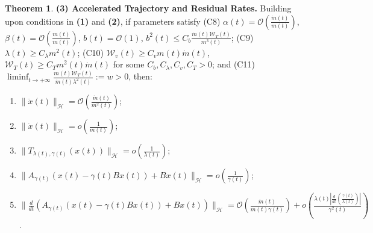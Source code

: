 \documentclass{article}
\theoremstyle{definition}
\newtheorem{theorem}{Theorem}[section]
\theoremstyle{definition}
\theoremstyle{definition}
\begin{document}
\begin{theorem}
\smallskip
\noindent \textbf{(3) Accelerated Trajectory and Residual Rates.} Building upon conditions in \textbf{(1)} and \textbf{(2)}, if parameters satisfy {\rm (C8)} $\alpha(t) = \mathcal{O}( \frac{\dot{m}(t)}{m(t)} )$, $\beta(t) = \mathcal{O}( \frac{m(t)}{\dot{m}(t)} )$, $b(t) = \mathcal{O}(1)$, $b^2(t) \leq C_b \frac{\dot{m}(t) \mathcal{W}_T(t)}{m^3(t)}$; {\rm (C9)} $\lambda(t) \ge C_{\lambda} m^2(t)$; {\rm (C10)} $\mathcal{W}_v(t) \ge C_v m(t)\dot{m}(t)$, $\mathcal{W}_T(t) \ge C_T m^2(t)\dot{m}(t)$ for some $C_b, C_{\lambda}, C_v, C_T > 0$; and {\rm (C11)} $\liminf_{t \to +\infty} \frac{m(t) \mathcal{W}_T(t)}{\dot{m}(t) \lambda^2(t)}:=w > 0$, then:
\begin{enumerate}[label=(\roman*), resume, nosep, itemsep=2pt]
    \item $\|\ddot{x}(t)\|_{\mathcal{H}} = \mathcal{O}\left( \frac{\dot{m}(t)}{m^2(t)} \right)$;
    \item $\|\dot{x}(t)\|_{\mathcal{H}} = o\left( \frac{1}{m(t)} \right)$;
    \item $\|T_{\lambda(t), \gamma(t)}(x(t))\|_{\mathcal{H}} = o\left( \frac{1}{\lambda(t)} \right)$;
    \item $\| A_{\gamma(t)} ( x(t) - \gamma(t) Bx(t) ) + Bx(t) \|_{\mathcal{H}} = o\left( \frac{1}{\gamma(t)} \right)$;
    \item $\| \frac{d}{dt} ( A_{\gamma(t)} ( x(t) - \gamma(t) Bx(t) ) + Bx(t) ) \|_{\mathcal{H}} = \mathcal{O}\left( \frac{\dot{m}(t)}{m(t) \gamma(t)} \right) + o\left( \frac{\lambda(t) | \frac{d}{dt} ( \frac{\gamma(t)}{\lambda(t)} ) |}{\gamma^2(t)} \right)$.
\end{enumerate}
\end{theorem}
\end{document}
